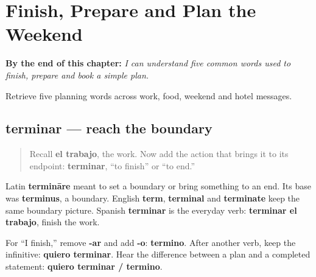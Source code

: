 
\chapter{Finish, Prepare and Plan the Weekend}
\label{ch:terminar-preparar-fin-semana-reservar-incluir}

\begin{chapteropening}
\textbf{By the end of this chapter:} \emph{I can understand five common words used to finish, prepare and book a simple plan.}

Retrieve five planning words across work, food, weekend and hotel messages.
\end{chapteropening}

\section[terminar]{terminar — reach the boundary}

\label{lesson:ES-C409-terminar}



\begin{quote}
Recall \textbf{el trabajo}, the work. Now add the action that brings it to its endpoint: \textbf{terminar}, “to finish” or “to end.”
\end{quote}

\begin{cousinweb}
Latin \textbf{termināre} meant to set a boundary or bring something to an end. Its base was \textbf{terminus}, a boundary. English \textbf{term}, \textbf{terminal} and \textbf{terminate} keep the same boundary picture. Spanish \textbf{terminar} is the everyday verb: \textbf{terminar el trabajo}, finish the work.
\end{cousinweb}

\begin{grammarlens}[title={Grammar Lens: the regular -ar frame}]
For “I finish,” remove \textbf{-ar} and add \textbf{-o}: \textbf{termino}. After another verb, keep the infinitive: \textbf{quiero terminar}. Hear the difference between a plan and a completed statement: \textbf{quiero terminar / termino}.
\end{grammarlens}

